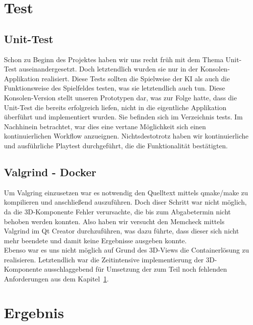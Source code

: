 \documentclass[a4paper]{scrartcl}
\begin{document}
\section{Test}\label{ch:Test}
\subsection{Unit-Test}\label{ch:Unit}
Schon zu Beginn des Projektes haben wir uns recht früh mit dem Thema Unit-Test auseinandergesetzt. Doch letztendlich wurden sie nur in der Konsolen-Applikation realisiert. Diese Tests sollten die Spielweise der KI als auch die 
Funktionsweise des Spielfeldes testen, was sie letztendlich auch tun. Diese Konsolen-Version stellt unseren Prototypen dar, was zur Folge hatte, dass die Unit-Test die bereits erfolgreich liefen, nicht in die eigentliche Applikation überführt und implementiert wurden. Sie befinden sich im Verzeichnis tests. Im Nachhinein betrachtet, war dies eine vertane Möglichkeit sich einen kontinuierlichen Workflow anzueignen. Nichtsdestotrotz haben wir kontinuierliche und ausführliche Playtest durchgeführt, die die Funktionalität bestätigten.

\subsection{Valgrind - Docker}\label{ch:Valgrind&Docker}
Um Valgring einzusetzen war es notwendig den Quelltext mittels qmake/make zu kompilieren und anschließend auszuführen. Doch diser Schritt war nicht möglich, da die 3D-Komponente Fehler verursachte, die bis zum Abgabetermin nicht behoben werden konnten. Also haben wir versucht den Memcheck mittels Valgrind im Qt Creator durchzuführen, was dazu führte, dass dieser sich nicht mehr beendete und damit keine Ergebnisse ausgeben konnte.
\\
Ebenso war es uns nicht möglich auf Grund des 3D-Views die Containerlösung zu realisieren. Letztendlich war die Zeitintensive implementierung der 3D-Komponente ausschlaggebend für Umsetzung der zum Teil noch fehlenden Anforderungen aus dem Kapitel~\ref{ch:Test}.

\section{Ergebnis}\label{ch:Ergebnis}
\end{document}
